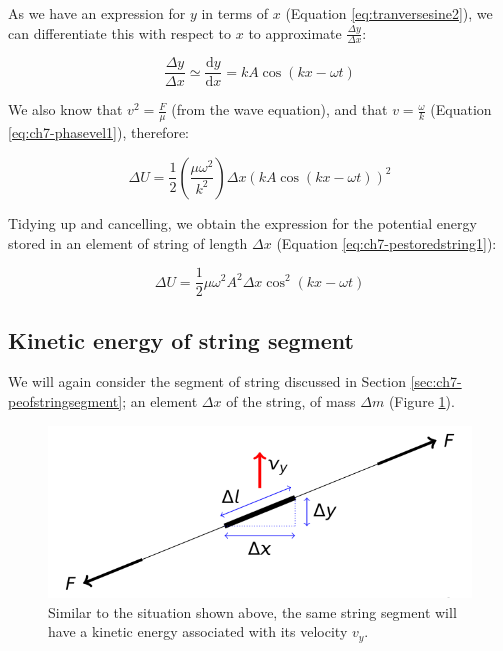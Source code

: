 \documentclass[
]{book}
\begin{document}
As we have an expression for \(y\) in terms of \(x\) (Equation \eqref{eq:tranversesine2}), we can differentiate this with respect to \(x\) to approximate \(\frac{\Delta y}{\Delta x}\):

\begin{equation}
\frac{\Delta y}{\Delta x} \simeq \frac{\mathrm{d} y}{\mathrm{d} x} = kA \cos (kx - \omega t)
\end{equation}

We also know that \(v^2 = \frac{F}{\mu}\) (from the wave equation), and that \(v = \frac{\omega}{k}\) (Equation \eqref{eq:ch7-phasevel1}), therefore:

\begin{equation}
\Delta U = \frac{1}{2} \left( \frac{\mu \omega^2}{k^2} \right) \Delta x \left( kA \cos (kx - \omega t) \right)^2
\end{equation}

Tidying up and cancelling, we obtain the expression for the potential energy stored in an element of string of length \(\Delta x\) (Equation \eqref{eq:ch7-pestoredstring1}):

\begin{equation}
\Delta U = \frac{1}{2} \mu \omega^2 A^2 \Delta x \cos^2(kx-\omega t)
\label{eq:ch7-pestoredstring1}
\end{equation}

\hypertarget{sec:ch7-keofstringsegment}{%
\subsection{Kinetic energy of string segment}\label{sec:ch7-keofstringsegment}}

We will again consider the segment of string discussed in Section \ref{sec:ch7-peofstringsegment}; an element \(\Delta x\) of the string, of mass \(\Delta m\) (Figure \ref{fig:ch7-kestringsegment}).

\begin{figure}

{\centering \includegraphics[width=0.7\linewidth]{visualisations/LaTeX/ch7-keofstringsegment} 

}

\caption{Similar to the situation shown above, the same string segment will have a kinetic energy associated with its velocity $v_y$.}\label{fig:ch7-kestringsegment}
\end{figure}
\end{document}
